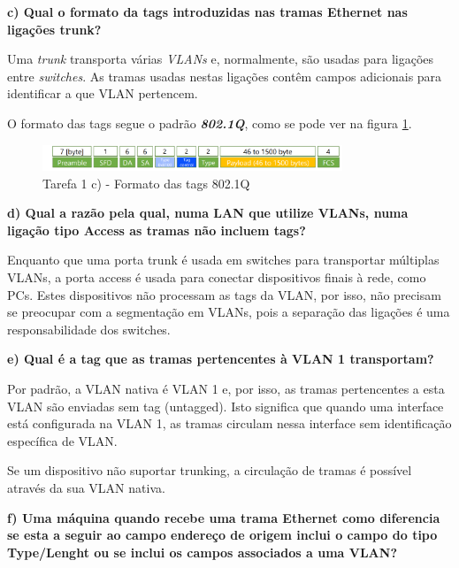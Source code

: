 \documentclass[11pt,english, openright, oneside]{book}
\begin{document}
\pagebreak
\textbf{c) Qual o formato da tags introduzidas nas tramas Ethernet nas ligações trunk?}
\vspace{0.2cm}

Uma \textit{trunk} transporta várias \textit{VLANs} e, normalmente, são usadas
para ligações entre \textit{switches}. As tramas usadas nestas ligações contêm
campos adicionais para identificar a que VLAN pertencem.

O formato das tags segue o padrão \textit{\textbf{802.1Q}}, como se pode ver na
figura \ref{fig:1c}.
\vspace{0.4cm}

\begin{figure}[htp]
    \centering
    \includegraphics[width=0.8\textwidth]{imagens/Tarefa1/1.c.png}
    \caption{Tarefa 1 c) - Formato das tags 802.1Q}
    \label{fig:1c}
\end{figure} 

\vspace{0.8cm}


\textbf{d) Qual a razão pela qual, numa LAN que utilize VLANs, numa ligação tipo Access as tramas não incluem tags?}
\vspace{0.2cm}

Enquanto que uma porta trunk é usada em switches para transportar múltiplas
VLANs, a porta access é usada para conectar dispositivos finais à rede, como
PCs. Estes dispositivos não processam as tags da VLAN, por isso, não precisam se
preocupar com a segmentação em VLANs, pois a separação das ligações é uma
responsabilidade dos switches.
\vspace{0.8cm}


\textbf{e) Qual é a tag que as tramas pertencentes à VLAN 1 transportam?}
\vspace{0.2cm}

Por padrão, a VLAN nativa é VLAN 1 e, por isso, as tramas pertencentes a esta
VLAN são enviadas sem tag (untagged). Isto significa que quando uma interface
está configurada na VLAN 1, as tramas circulam nessa interface sem identificação
específica de VLAN. 

Se um dispositivo não suportar trunking, a circulação de tramas é possível
através da sua VLAN nativa.
\vspace{0.8cm}


\textbf{f) Uma máquina quando recebe uma trama Ethernet como diferencia se esta a seguir ao campo endereço de origem inclui o campo do tipo Type/Lenght ou se inclui os campos associados a uma VLAN?}
\vspace{0.2cm}
\end{document}
